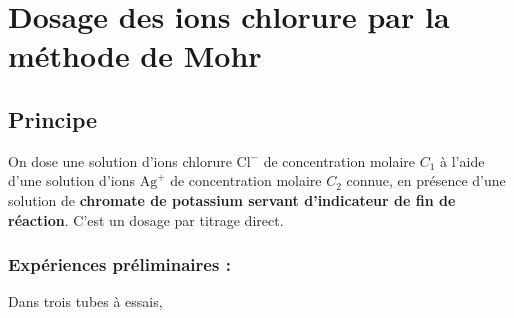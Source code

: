 \documentclass[11pt,a4paper]{report}
\begin{document}
\newpage
\section{Dosage des ions chlorure par la méthode de Mohr}
\subsection{Principe}

On dose une solution d'ions chlorure $\text{Cl}^-$ de concentration molaire $C_1$ à l'aide d'une solution d'ions $\text{Ag}^+$ de concentration molaire $C_2$ connue, en présence d'une solution de 
\textbf{chromate de potassium servant d'indicateur de fin de réaction}. C'est un dosage par titrage direct.

\subsubsection*{Expériences préliminaires :} 
Dans trois tubes à essais,
\end{document}
